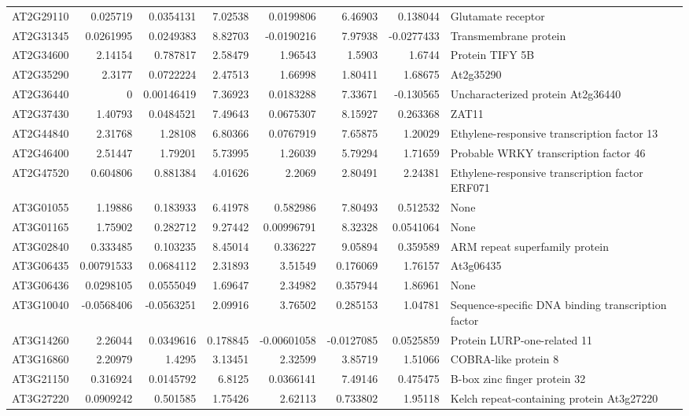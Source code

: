 \documentclass[11pt]{article}
\begin{document}
\begin{center}
\begin{tabular}{lrrrrrrl}
AT2G29110 & 0.025719 & 0.0354131 & 7.02538 & 0.0199806 & 6.46903 & 0.138044 & Glutamate receptor\\
AT2G31345 & 0.0261995 & 0.0249383 & 8.82703 & -0.0190216 & 7.97938 & -0.0277433 & Transmembrane protein\\
AT2G34600 & 2.14154 & 0.787817 & 2.58479 & 1.96543 & 1.5903 & 1.6744 & Protein TIFY 5B\\
AT2G35290 & 2.3177 & 0.0722224 & 2.47513 & 1.66998 & 1.80411 & 1.68675 & At2g35290\\
AT2G36440 & 0 & 0.00146419 & 7.36923 & 0.0183288 & 7.33671 & -0.130565 & Uncharacterized protein At2g36440\\
AT2G37430 & 1.40793 & 0.0484521 & 7.49643 & 0.0675307 & 8.15927 & 0.263368 & ZAT11\\
AT2G44840 & 2.31768 & 1.28108 & 6.80366 & 0.0767919 & 7.65875 & 1.20029 & Ethylene-responsive transcription factor 13\\
AT2G46400 & 2.51447 & 1.79201 & 5.73995 & 1.26039 & 5.79294 & 1.71659 & Probable WRKY transcription factor 46\\
AT2G47520 & 0.604806 & 0.881384 & 4.01626 & 2.2069 & 2.80491 & 2.24381 & Ethylene-responsive transcription factor ERF071\\
AT3G01055 & 1.19886 & 0.183933 & 6.41978 & 0.582986 & 7.80493 & 0.512532 & None\\
AT3G01165 & 1.75902 & 0.282712 & 9.27442 & 0.00996791 & 8.32328 & 0.0541064 & None\\
AT3G02840 & 0.333485 & 0.103235 & 8.45014 & 0.336227 & 9.05894 & 0.359589 & ARM repeat superfamily protein\\
AT3G06435 & 0.00791533 & 0.0684112 & 2.31893 & 3.51549 & 0.176069 & 1.76157 & At3g06435\\
AT3G06436 & 0.0298105 & 0.0555049 & 1.69647 & 2.34982 & 0.357944 & 1.86961 & None\\
AT3G10040 & -0.0568406 & -0.0563251 & 2.09916 & 3.76502 & 0.285153 & 1.04781 & Sequence-specific DNA binding transcription factor\\
AT3G14260 & 2.26044 & 0.0349616 & 0.178845 & -0.00601058 & -0.0127085 & 0.0525859 & Protein LURP-one-related 11\\
AT3G16860 & 2.20979 & 1.4295 & 3.13451 & 2.32599 & 3.85719 & 1.51066 & COBRA-like protein 8\\
AT3G21150 & 0.316924 & 0.0145792 & 6.8125 & 0.0366141 & 7.49146 & 0.475475 & B-box zinc finger protein 32\\
AT3G27220 & 0.0909242 & 0.501585 & 1.75426 & 2.62113 & 0.733802 & 1.95118 & Kelch repeat-containing protein At3g27220\\

\end{tabular}
\end{center}
\end{document}
